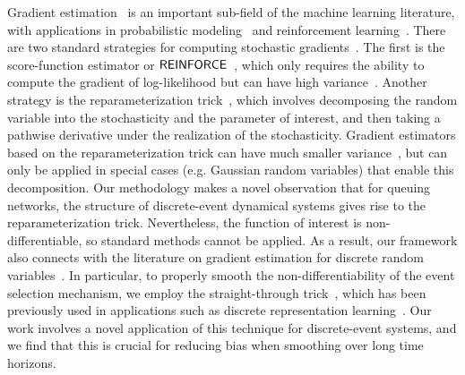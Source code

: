 Gradient estimation~\cite{mohamed2020monte} is an important sub-field of the machine learning literature, with applications in probabilistic modeling~\cite{kingma2013auto, jang2016categorical} and reinforcement learning~\cite{williams1992simple, sutton1999policy}. There are two standard strategies for computing stochastic gradients~\cite{mohamed2020monte}. The first is the score-function estimator or $\mathsf{REINFORCE}$~\cite{williams1992simple,sutton1999policy}, which only requires the ability to compute the gradient of log-likelihood but can have high variance~\cite{greensmith2004variance}. Another strategy is the reparameterization trick~\cite{kingma2013auto}, which involves decomposing the random variable into the stochasticity and the parameter of interest, and then taking a pathwise derivative under the realization of the stochasticity. Gradient estimators based on the reparameterization trick can have much smaller variance~\cite{mohamed2020monte}, but can only be applied in special cases (e.g. Gaussian random variables) that enable this decomposition. Our methodology makes a novel observation that for queuing networks, the structure of discrete-event dynamical systems gives rise to the reparameterization trick. Nevertheless, the function of interest is non-differentiable, so standard methods cannot be applied. As a result, our framework also connects with the literature on gradient estimation for discrete random variables~\cite{jang2016categorical, maddison2016concrete,  bengio2013estimating, tucker2017rebar}. In particular, to properly smooth the non-differentiability of the event selection mechanism, we employ the straight-through trick~\cite{bengio2013estimating}, which has been previously used in applications such as discrete representation learning~\cite{van2017neural}. Our work involves a novel application of this technique for discrete-event systems, and we find that this is crucial for reducing bias when smoothing over long time horizons.


